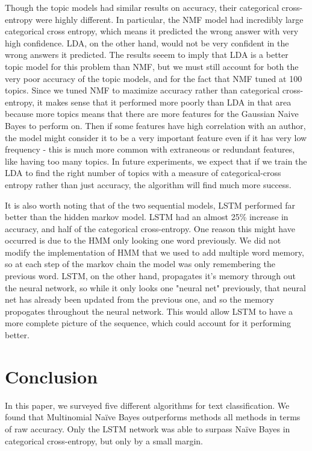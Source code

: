\documentclass{article}
\begin{document}
Though the topic models had similar results on accuracy, their categorical cross-entropy were highly different. In particular, the NMF model had incredibly large categorical cross entropy, which means it predicted the wrong answer with very high confidence. LDA, on the other hand, would not be very confident in the wrong answers it predicted. The results seeem to imply that LDA is a better topic model for this problem than NMF, but we must still account for both the very poor accuracy of the topic models, and for the fact that NMF tuned at 100 topics. Since we tuned NMF to maximize accuracy rather than categorical cross-entropy, it makes sense that it performed more poorly than LDA in that area because more topics means that there are more features for the Gaussian Naive Bayes to perform on. Then if some features have high correlation with an author, the model might consider it to be a very important feature even if it has very low frequency - this is much more common with extraneous or redundant features, like having too many topics. In future experiments, we expect that if we train the LDA to find the right number of topics with a measure of categorical-cross entropy rather than just accuracy, the algorithm will find much more success. 

It is also worth noting that of the two sequential models, LSTM performed far better than the hidden markov model. LSTM had an almost 25\% increase in accuracy, and half of the categorical cross-entropy. One reason this might have occurred is due to the HMM only looking one word previously. We did not modify the implementation of HMM that we used to add multiple word memory, so at each step of the markov chain the model was only remembering the previous word. LSTM, on the other hand, propagates it's memory through out the neural network, so while it only looks one "neural net" previously, that neural net has already been updated from the previous one, and so the memory propogates throughout the neural network. This would allow LSTM to have a more complete picture of the sequence, which could account for it performing better. 

\section{Conclusion}
\label{conclusion}

In this paper, we surveyed five different algorithms for text classification.
We found that Multinomial Na\"ive Bayes outperforms methods all methods in
terms of raw accuracy.
Only the LSTM network was able to surpass Na\"ive
Bayes in categorical cross-entropy, but only by a small margin.
\end{document}
